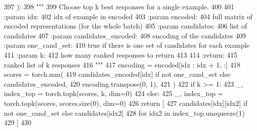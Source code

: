 \begin{DoxyCode}
397     ):
398         \textcolor{stringliteral}{"""}
399 \textcolor{stringliteral}{        Choose top k best responses for a single example.}
400 \textcolor{stringliteral}{}
401 \textcolor{stringliteral}{        :param idx:}
402 \textcolor{stringliteral}{            idx of example in encoded}
403 \textcolor{stringliteral}{        :param encoded:}
404 \textcolor{stringliteral}{            full matrix of encoded representations (for the whole batch)}
405 \textcolor{stringliteral}{        :param candidates:}
406 \textcolor{stringliteral}{            list of candidates}
407 \textcolor{stringliteral}{        :param candidates\_encoded:}
408 \textcolor{stringliteral}{            encoding of the candidates}
409 \textcolor{stringliteral}{        :param one\_cand\_set:}
410 \textcolor{stringliteral}{            true if there is one set of candidates for each example}
411 \textcolor{stringliteral}{        :param k:}
412 \textcolor{stringliteral}{            how many ranked responses to return}
413 \textcolor{stringliteral}{}
414 \textcolor{stringliteral}{        :return:}
415 \textcolor{stringliteral}{            ranked list of k responses}
416 \textcolor{stringliteral}{        """}
417         encoding = encoded[idx : idx + 1, :]
418         scores = torch.mm(
419             candidates\_encoded[idx] \textcolor{keywordflow}{if} \textcolor{keywordflow}{not} one\_cand\_set \textcolor{keywordflow}{else} candidates\_encoded,
420             encoding.transpose(0, 1),
421         )
422         \textcolor{keywordflow}{if} k >= 1:
423             \_, index\_top = torch.topk(scores, k, dim=0)
424         \textcolor{keywordflow}{else}:
425             \_, index\_top = torch.topk(scores, scores.size(0), dim=0)
426         \textcolor{keywordflow}{return} [
427             candidates[idx][idx2] \textcolor{keywordflow}{if} \textcolor{keywordflow}{not} one\_cand\_set \textcolor{keywordflow}{else} candidates[idx2]
428             \textcolor{keywordflow}{for} idx2 \textcolor{keywordflow}{in} index\_top.unsqueeze(1)
429         ]
430 
\end{DoxyCode}
\mbox{\label{classprojects_1_1image__chat_1_1transresnet__multimodal_1_1modules_1_1TransresnetMultimodalModel_a9e5dd2a418ccbbe70d1b7f8ae3be78ed}} 
